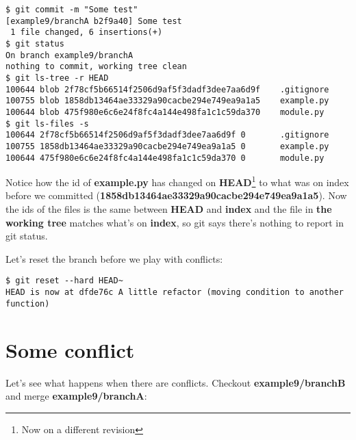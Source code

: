 \begin{lstlisting}[style=console_style,
	basicstyle=\small,
	caption=committing]
$ git commit -m "Some test"
[example9/branchA b2f9a40] Some test
 1 file changed, 6 insertions(+)
$ git status
On branch example9/branchA
nothing to commit, working tree clean
$ git ls-tree -r HEAD
100644 blob 2f78cf5b66514f2506d9af5f3dadf3dee7aa6d9f    .gitignore
100755 blob 1858db13464ae33329a90cacbe294e749ea9a1a5    example.py
100644 blob 475f980e6c6e24f8fc4a144e498fa1c1c59da370    module.py
$ git ls-files -s
100644 2f78cf5b66514f2506d9af5f3dadf3dee7aa6d9f 0       .gitignore
100755 1858db13464ae33329a90cacbe294e749ea9a1a5 0       example.py
100644 475f980e6c6e24f8fc4a144e498fa1c1c59da370 0       module.py
\end{lstlisting}

Notice how the id of {\bf example.py} has changed on {\bf HEAD}\footnote{Now on a different revision} to what was on index before we
committed ({\bf 1858db13464ae33329a90cacbe294e749ea9a1a5}). Now the ids of the files is the same between {\bf HEAD} and {\bf index}
and the file in {\bf the working tree} matches what's on {\bf index}, so git says there's nothing to report in git status.

Let's reset the branch before we play with conflicts:

\begin{lstlisting}[style=console_style,
	basicstyle=\small,
	caption=Resetting]
$ git reset --hard HEAD~
HEAD is now at dfde76c A little refactor (moving condition to another function)
\end{lstlisting}

\section{Some conflict}
Let's see what happens when there are conflicts. Checkout {\bf example9/branchB} and merge {\bf example9/branchA}:

